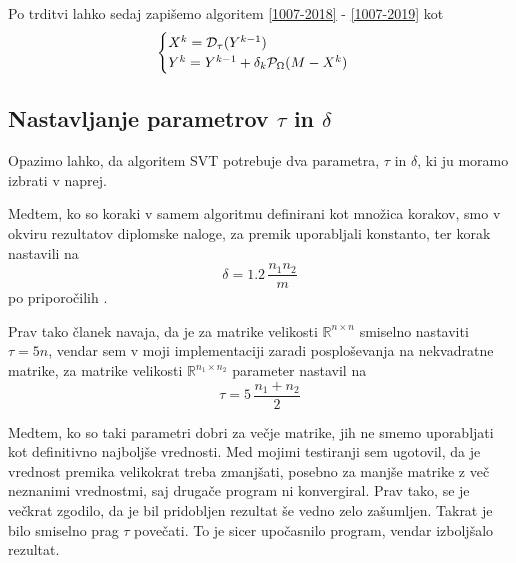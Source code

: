 Po trditvi lahko sedaj zapišemo algoritem \eqref{1007-2018} - \eqref{1007-2019} kot \cite{CCS}
\[
    \begin{cases}
        X^k = \mathcal{D}_\tau(Y^{k-1}) \\
        Y^k = Y^{k-1} + \delta_k \mathcal{P}_\Omega(M - X^k) 
    \end{cases}
\]

\subsection{Nastavljanje parametrov $\tau$ in $\delta$}
Opazimo lahko, da algoritem SVT potrebuje dva parametra, $\tau$ in $\delta$, ki ju moramo izbrati v naprej.

Medtem, ko so koraki v samem algoritmu definirani kot množica korakov, 
smo v okviru rezultatov diplomske naloge,  za premik uporabljali konstanto, ter korak nastavili na 
\[
    \delta = 1.2\, \dfrac{n_1 n_2}{m}
\] po priporočilih \cite{CCS}. 

Prav tako članek \cite{CCS} navaja, da je za matrike velikosti $\mathbb{R}^{n \times n}$ smiselno nastaviti $\tau = 5n$, vendar sem v moji implementaciji zaradi posploševanja na nekvadratne matrike, za matrike velikosti $\mathbb{R}^{n_1 \times n_2}$ parameter nastavil na
\[
    \tau = 5\, \frac{n_1+n_2}{2}
\]

Medtem, ko so taki parametri dobri za večje matrike, jih ne smemo uporabljati kot definitivno najboljše vrednosti. Med mojimi testiranji sem ugotovil, da je vrednost premika velikokrat treba zmanjšati, posebno za manjše matrike z več neznanimi vrednostmi, saj drugače program ni konvergiral. Prav tako, se je večkrat zgodilo, da je bil pridobljen rezultat še vedno zelo zašumljen. Takrat je bilo smiselno prag $\tau$ povečati. To je sicer upočasnilo program, vendar izboljšalo rezultat.